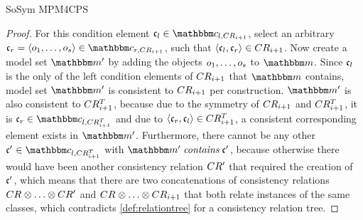 \begin{copiedFrom}{SoSym MPM4CPS}
\begin{proof}
    For this condition element $\conditionelement{c}{l} \in \condition{c}{l,\consistencyrelation{CR}{i+1}}$, select an arbitrary $\conditionelement{c}{r} = \tupled{\object{o}{1}, \dots, \object{o}{s}} \in \condition{c}{r, \consistencyrelation{CR}{i+1}}$, such that $\langle \mathfrak{c}_{l}, \mathfrak{c}_{r} \rangle \in CR_{i+1}$.
    Now create a model set $\modelset{m'}$ by adding the objects $o_{1}, \dots, o_{s}$ to $\modelset{m}$.
    Since $\mathfrak{c}_{l}$ is the only of the left condition elements of $CR_{i+1}$ that $\modelset{m}$ contains, model set $\modelset{m'}$ is consistent to $CR_{i+1}$ per construction.
    $\modelset{m'}$ is also consistent to $CR^T_{i+1}$, because due to the symmetry of $CR_{i+1}$ and $CR^T_{i+1}$, it is $\conditionelement{c}{r} \in \condition{c}{l,\consistencyrelation{CR^T}{i+1}}$ and due to $\langle \mathfrak{c}_{r}, \mathfrak{c}_{l} \rangle \in CR^T_{i+1}$, a consistent corresponding element exists in $\modelset{m'}$. 
    Furthermore, there cannot be any other $\conditionelement{c'}{} \in \condition{c}{l,\consistencyrelation{CR^T}{i+1}}$ with $\modelset{m'} \containsmath \conditionelement{c'}{}$, because otherwise there would have been another consistency relation $CR'_{}$ that required the creation of $\mathfrak{c'}_{}$, which means that there are two concatenations of consistency relations $\consistencyrelation{CR}{} \concat \dots \concat \consistencyrelation{CR'}{}$ and $\consistencyrelation{CR}{} \concat \dots \concat \consistencyrelation{CR}{i+1}$ that both relate instances of the same classes, which contradicts \autoref{def:relationtree} for a consistency relation tree.
    

\end{proof}
\end{copiedFrom}
